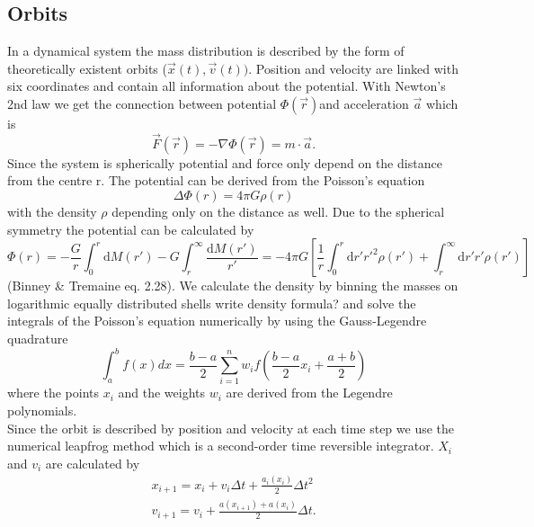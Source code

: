 \documentclass[a4paper,12pt,abstracton]{scrartcl}
\begin{document}
\subsection{Orbits}
In a dynamical system the mass distribution is described by the form of theoretically existent orbits (\(\vec{x}(t),\vec{v}(t))\). Position and velocity are linked with six coordinates and contain all information about the potential. With Newton's 2nd law we get the connection between potential \(\Phi(\vec{r})\)and acceleration \(\vec{a}\) which is \[\vec{F}(\vec{r})=-\nabla\Phi(\vec{r})=m\cdot\vec{a}.\] Since the system is spherically potential and force only depend on the distance from the centre r. The potential can be derived from the Poisson's equation \begin{equation}
\Delta\Phi(r)=4\pi G \rho(r)
\end{equation}
with the density \(\rho\) depending only on the distance as well. Due to the spherical symmetry the potential can be calculated by 
\begin{equation}
\Phi(r)=-\frac{G}{r}\int_0^r{\mathrm{d}M(r')}-G\int_r^{\infty}{\frac{\mathrm{d}M(r')}{r'}}=-4\pi G\left[\frac{1}{r}\int_0^r\mathrm{d}r'r'^2\rho(r')+\int_r^{\infty}\mathrm{d}r'r'\rho(r')\right]
\end{equation} (Binney \& Tremaine eq. 2.28). We calculate the density by binning the masses on logarithmic equally distributed shells \color{red} write density formula? \color{black} and solve the integrals of the Poisson's equation numerically by using the Gauss-Legendre quadrature \[\int_a^b f(x)dx = \frac{b-a}{2}\sum_{i=1}^n w_i f\left(\frac{b-a}{2}x_i+\frac{a+b}{2}\right)\] where the points \(x_i\) and the weights \(w_i\) are derived from the Legendre polynomials.\\ Since the orbit is described by position and velocity at each time step we use the numerical leapfrog method which is a second-order time reversible integrator. \(X_i\) and \(v_i\) are calculated by 
\begin{align*}
x_{i+1}=x_i+v_i\Delta t+\frac{a_i(x_i)}{2}\Delta t^2 \\
v_{i+1}=v_i+\frac{a(x_{i+1})+a(x_i)}{2}\Delta t.
\end{align*}
\end{document}
